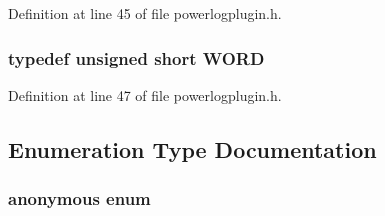 Definition at line 45 of file powerlogplugin.\-h.

\hypertarget{group__powerlogplugin_ga197942eefa7db30960ae396d68339b97}{
\subsubsection[{W\-O\-R\-D}]{\setlength{\rightskip}{0pt plus 5cm}typedef unsigned short {\bf W\-O\-R\-D}}}\label{group__powerlogplugin_ga197942eefa7db30960ae396d68339b97}


Definition at line 47 of file powerlogplugin.\-h.



\subsection{Enumeration Type Documentation}
\hypertarget{group__powerlogplugin_gab59c1bec446b10af208f977a871d910b}{\subsubsection[{anonymous enum}]{\setlength{\rightskip}{0pt plus 5cm}anonymous enum}}\label{group__powerlogplugin_gab59c1bec446b10af208f977a871d910b}
